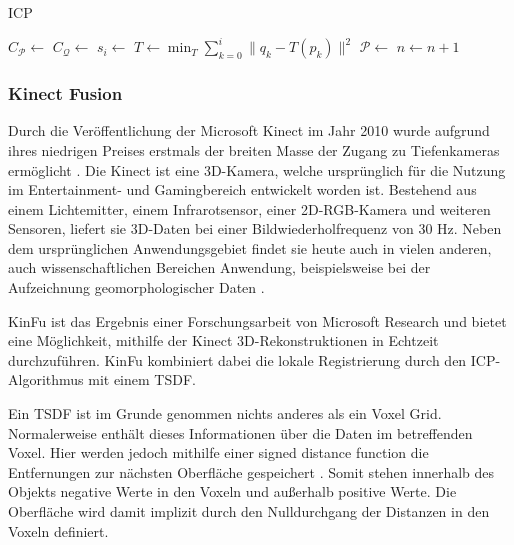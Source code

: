 \begin{algorithm}[H]
\caption[\acl{ICP}]{\acl{ICP} \cite[56]{elkhrachy2008phdthesis}}
\label{alg:icp}
\begin{algorithmic}
\State $C_\mathcal{P} \gets$ 
\State $C_\mathcal{Q} \gets$ 
\State {}
		\State $s_i \gets$ 
	\EndFor
	\State $T \gets \min_T \sum\limits_{k=0}^{i} \|q_k - T(p_k)\|^2$
	\State $\mathcal{P} \gets$ 
	\State $n \gets n + 1$
\EndWhile
\end{algorithmic}
\end{algorithm}

\subsubsection{Kinect Fusion}
\label{subsubsec:kinfu}

Durch die Veröffentlichung der Microsoft Kinect im Jahr 2010 wurde aufgrund ihres niedrigen Preises erstmals der breiten Masse der Zugang zu Tiefenkameras ermöglicht \cite[1:55]{kinfuTalkYoutube}.
Die Kinect ist eine 3D-Kamera, welche ursprünglich für die Nutzung im Entertainment- und Gamingbereich entwickelt worden ist.
Bestehend aus einem Lichtemitter, einem Infrarotsensor, einer 2D-RGB-Kamera und weiteren Sensoren, liefert sie 3D-Daten bei einer Bildwiederholfrequenz von 30 Hz.
Neben dem ursprünglichen Anwendungsgebiet findet sie heute auch in vielen anderen, auch wissenschaftlichen Bereichen Anwendung, beispielsweise bei der Aufzeichnung geomorphologischer Daten \cite{mankoff2013kinect}.

\ac{KinFu} ist das Ergebnis einer Forschungsarbeit von Microsoft Research \cite{izadi2011kinectfusion, microsoftKinfuYoutube} und bietet eine Möglichkeit, mithilfe der Kinect 3D-Rekonstruktionen in Echtzeit durchzuführen.
\ac{KinFu} kombiniert dabei die lokale Registrierung durch den \ac{ICP}-Algorithmus mit einem \ac{TSDF}.

Ein \ac{TSDF} ist im Grunde genommen nichts anderes als ein Voxel Grid.
Normalerweise enthält dieses Informationen über die Daten im betreffenden Voxel.
Hier werden jedoch mithilfe einer signed distance function die Entfernungen zur nächsten Oberfläche gespeichert \cite{curless1996volumetric}.
Somit stehen innerhalb des Objekts negative Werte in den Voxeln und außerhalb positive Werte.
Die Oberfläche wird damit implizit durch den Nulldurchgang der Distanzen in den Voxeln definiert.

